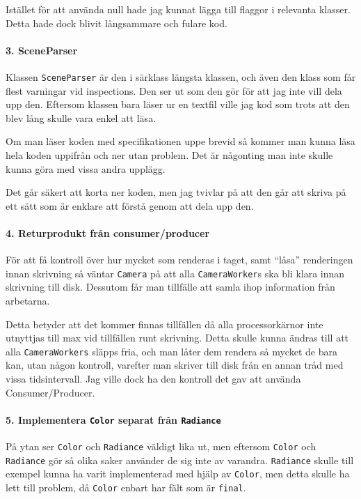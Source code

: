 \documentclass{article}
\begin{document}
Istället för att använda null hade jag kunnat lägga till flaggor i
relevanta klasser. Detta hade dock blivit långsammare och fulare kod.

\paragraph{3. SceneParser}
Klassen \texttt{SceneParser} är den i särklass längsta klassen, och
även den klass som får flest varningar vid inspections. Den ser ut som
den gör för att jag inte vill dela upp den. Eftersom klassen bara
läser ur en textfil ville jag kod som trots att den blev lång skulle
vara enkel att läsa.

Om man läser koden med specifikationen uppe brevid så kommer man kunna
läsa hela koden uppifrån och ner utan problem. Det är någonting man
inte skulle kunna göra med vissa andra upplägg.

Det går säkert att korta ner koden, men jag tvivlar på att den går att
skriva på ett sätt som är enklare att förstå genom att dela upp den.

\paragraph{4. Returprodukt från consumer/producer}
För att få kontroll över hur mycket som renderas i taget, samt
``låsa'' renderingen innan skrivning så väntar \texttt{Camera} på att
alla \texttt{CameraWorker}s ska bli klara innan skrivning till
disk. Dessutom får man tillfälle att samla ihop information från
arbetarna.

Detta betyder att det kommer finnas tillfällen då alla
processorkärnor inte utnyttjas till max vid tillfällen runt
skrivning. Detta skulle kunna ändras till att alla
\texttt{CameraWorkers} släpps fria, och man låter dem rendera så
mycket de bara kan, utan någon kontroll, varefter man skriver till
disk från en annan tråd med vissa tidsintervall. Jag ville dock ha den
kontroll det gav att använda Consumer/Producer.

\paragraph{5. Implementera \texttt{Color} separat från \texttt{Radiance}}
På ytan ser \texttt{Color} och \texttt{Radiance} väldigt lika ut, men
eftersom \texttt{Color} och \texttt{Radiance} gör så olika saker
använder de sig inte av varandra. \texttt{Radiance} skulle till
exempel kunna ha varit implementerad med hjälp av \texttt{Color}, men
detta skulle ha lett till problem, då \texttt{Color} enbart har fält
som är \texttt{final}.
\end{document}
